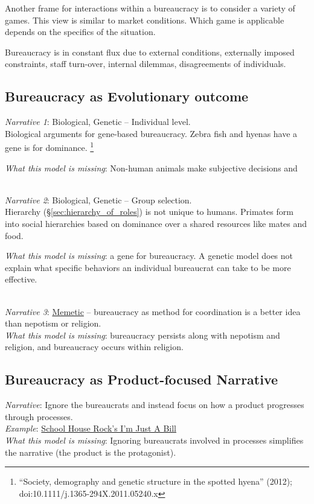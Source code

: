 
Another frame for interactions within a bureaucracy is to consider a variety of games. This view is similar to market conditions. Which game is applicable depends on the specifics of the situation. 

Bureaucracy is in constant flux due to external conditions, externally imposed constraints, staff turn-over, internal dilemmas, disagreements of individuals. 




\subsection{Bureaucracy as Evolutionary outcome}


\textit{Narrative 1}: Biological, Genetic -- Individual level. \\
Biological arguments for gene-based bureaucracy. Zebra fish and hyenas have a gene is for dominance. \footnote{``Society, demography and genetic structure in the spotted hyena'' (2012); doi:10.1111/j.1365-294X.2011.05240.x}


\textit{What this model is missing}: Non-human animals make subjective decisions and 

\ \\

\textit{Narrative 2}: Biological, Genetic -- Group selection. \\
Hierarchy (\S\ref{sec:hierarchy_of_roles}) is not unique to humans. Primates form into social hierarchies based on dominance over a shared resources like mates and food.

\textit{What this model is missing}: a gene for bureaucracy. A genetic model does not explain what specific behaviors an individual bureaucrat can take to be more effective. 

\ \\

\textit{Narrative 3}: \href{https://en.wikipedia.org/wiki/Memetics}{Memetic} -- bureaucracy as method for coordination is a better idea than nepotism or religion. \\
\textit{What this model is missing}: bureaucracy persists along with nepotism and religion, and bureaucracy occurs within religion. 

\subsection{Bureaucracy as Product-focused Narrative}
\textit{Narrative}: Ignore the bureaucrats and instead focus on how a product progresses through processes.\\
\textit{Example}: \href{https://www.youtube.com/watch?v=OgVKvqTItto}{School House Rock's I'm Just A Bill}\\
\textit{What this model is missing}: Ignoring bureaucrats involved in processes simplifies the narrative (the product is the protagonist). 


